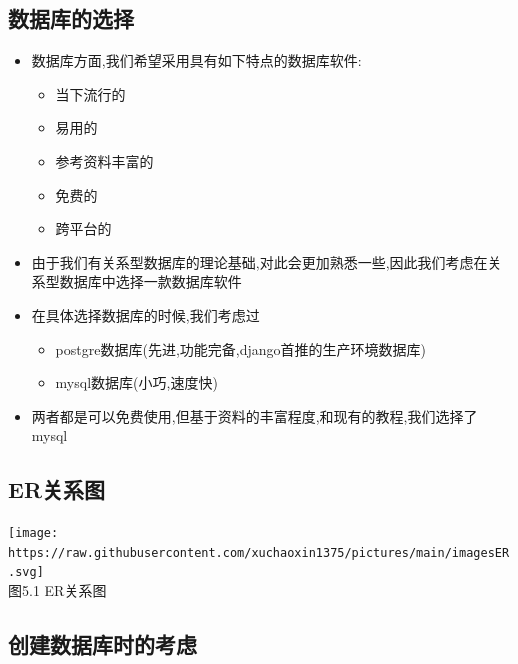 \documentclass[
]{article}
\begin{document}
\hypertarget{ux6570ux636eux5e93ux7684ux9009ux62e9}{%
\subsection{数据库的选择}\label{ux6570ux636eux5e93ux7684ux9009ux62e9}}

\begin{itemize}
\item
  数据库方面,我们希望采用具有如下特点的数据库软件:

  \begin{itemize}
  \item
    当下流行的
  \item
    易用的
  \item
    参考资料丰富的
  \item
    免费的
  \item
    跨平台的
  \end{itemize}
\item
  由于我们有关系型数据库的理论基础,对此会更加熟悉一些,因此我们考虑在关系型数据库中选择一款数据库软件
\item
  在具体选择数据库的时候,我们考虑过

  \begin{itemize}
  \item
    postgre数据库(先进,功能完备,django首推的生产环境数据库)
  \item
    mysql数据库(小巧,速度快)
  \end{itemize}
\item
  两者都是可以免费使用,但基于资料的丰富程度,和现有的教程,我们选择了mysql
\end{itemize}

\hypertarget{erux5173ux7cfbux56fe}{%
\subsection{ER关系图}\label{erux5173ux7cfbux56fe}}

\texttt{[image: https://raw.githubusercontent.com/xuchaoxin1375/pictures/main/imagesER.svg]}\\
图5.1 ER关系图

\hypertarget{ux521bux5efaux6570ux636eux5e93ux65f6ux7684ux8003ux8651}{%
\subsection{创建数据库时的考虑}\label{ux521bux5efaux6570ux636eux5e93ux65f6ux7684ux8003ux8651}}
\end{document}

